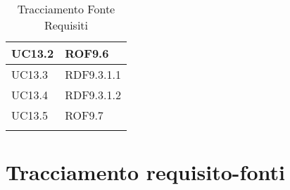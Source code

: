 \documentclass[../AnalisideiRequisiti.tex]{subfiles}
\begin{document}
\begin{longtable}{| p{4cm} | p{4cm} |}
		\hline
		\newline UC13.2 &  \newline ROF9.6 \\[1em]
		\hline
		\newline UC13.3 &   \newline RDF9.3.1.1 \\[1em]
		\hline
		\newline UC13.4 &  \newline RDF9.3.1.2 \\[1em]
		\hline
		\newline UC13.5 &  \newline ROF9.7 \\[1em]
		\hline
		
		\caption{Tracciamento Fonte Requisiti}
	\end{longtable}
\newpage
	\section{Tracciamento requisito-fonti}
\end{document}
